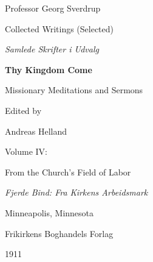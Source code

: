 \documentclass[12pt]{article}
\begin{document}
\begin{titlepage}
    \centering
    \vspace*{1.5in}

{\Large Professor Georg Sverdrup\par}
\vspace{0.15in}

{\large Collected Writings (Selected)\par}
{\large \textit{Samlede Skrifter i Udvalg}\par}

\vspace{0.6in}

{\LARGE\bfseries Thy Kingdom Come\par}
\vspace{0.15in}
{\large Missionary Meditations and Sermons\par}

\vspace{0.8in}

{\large Edited by\par}
\vspace{0.10in}
{\large Andreas Helland\par}

\vspace{0.8in}

{\large Volume IV:\par}
{\large From the Church’s Field of Labor\par}
{\small \textit{Fjerde Bind: Fra Kirkens Arbeidsmark}\par}

\vfill

{\small Minneapolis, Minnesota\par}
{\small Frikirkens Boghandels Forlag\par}
{\small 1911\par}

\vspace{0.5in}

\end{titlepage}




\tableofcontents
{}
\newpage


\pagebreak

\pagebreak
\pagebreak




 

\pagebreak
\end{document}
